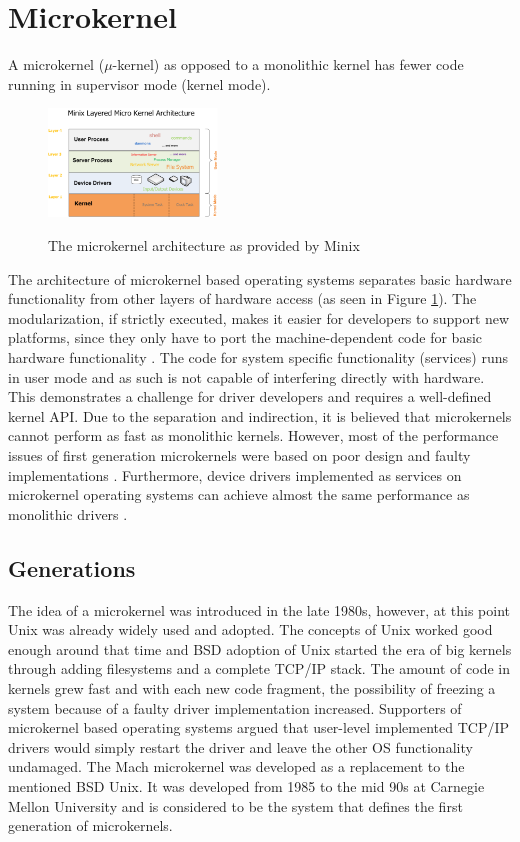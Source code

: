 \documentclass{acm_proc_article-sp}
\begin{document}
\section{Microkernel}
\label{sec:microkernel}
A microkernel ($\mu$-kernel) as opposed to a monolithic kernel has fewer code running in
supervisor mode (kernel mode).
\begin{figure}[!h]
\centering
\includegraphics[width=0.4\textwidth]{minixinternalstructure.png}
\label{fig:minixmicarch}
\caption{The microkernel architecture as provided by Minix \cite{minix}}
\end{figure}
The architecture of microkernel based operating systems separates basic
hardware functionality from other layers of hardware access (as seen in Figure \ref{fig:minixmicarch}).
The modularization, if strictly executed, makes it easier for developers to support new
platforms, since they only have to port the machine-dependent code for basic hardware functionality \cite{black92}.
The code for system specific functionality (services) runs in user mode and as such
is not capable of interfering directly with hardware.
This demonstrates a challenge for driver developers and requires a well-defined kernel API.
Due to the separation and indirection, it is believed that microkernels cannot perform as fast as
monolithic kernels.
However, most of the performance issues of first generation microkernels were based on poor design
and faulty implementations \cite{p237-liedtke}.
Furthermore, device drivers implemented as services on microkernel operating systems can achieve
almost the same performance as monolithic drivers \cite{uldd}.

\subsection{Generations}
The idea of a microkernel was introduced in the late 1980s, however, at this point Unix \cite{unix}
was already widely used and adopted.
The concepts of Unix worked good enough around that time and BSD \cite{bsd} adoption of Unix started
the era of big kernels through adding filesystems and a complete TCP/IP stack. %
The amount of code in kernels grew fast and with each new code fragment, the possibility of
freezing a system because of a faulty driver implementation increased.
Supporters of microkernel based operating systems argued that user-level implemented TCP/IP drivers
would simply restart the driver and leave the other OS functionality undamaged.
The Mach \cite{mach} microkernel was developed as a replacement to the mentioned BSD Unix.
It was developed from 1985 to the mid 90s at Carnegie Mellon University and is considered to be
the system that defines the first generation of microkernels.
\end{document}
